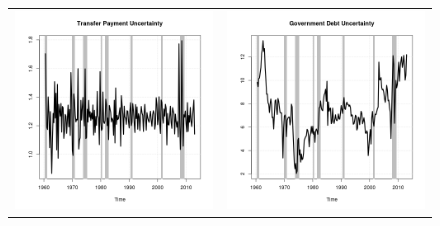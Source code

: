 \documentclass[11pt]{article}
\begin{document}
\begin{figure}
\begin{center}
\begin{tabular}{cc}
\includegraphics[scale=0.45]{./results/pics0.04/fpucoin_transfers.png} & \includegraphics[scale=0.45]{./results/pics0.04/fpucoin_debt.png}  
\end{tabular}
\end{center}
\end{figure} 
\end{document}
